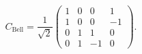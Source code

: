 \begin{equation}
C_{\text{Bell}} = \frac{1}{\sqrt{2}}\begin{pmatrix}
1 & 0 & 0 & 1 \\
1 & 0 & 0 & -1 \\
0 & 1 & 1 & 0 \\
0 & 1 & -1 & 0
\end{pmatrix}.
\end{equation}
